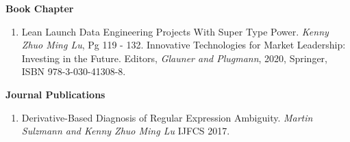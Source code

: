 \documentclass[margin,line]{res}
\begin{document}
\begin{resume}
{{\bf Book Chapter}
\begin{enumerate}
\item Lean Launch Data Engineering Projects With Super
    Type Power. \textit{Kenny Zhuo Ming Lu}, Pg 119 - 132. Innovative
    Technologies for Market Leadership: Investing in the
    Future. Editors, \textit{Glauner and Plugmann}, 2020, Springer,
    ISBN 978-3-030-41308-8.
\end{enumerate}



{\bf Journal Publications}
\begin{enumerate}
\item Derivative-Based Diagnosis of Regular Expression
  Ambiguity. \textit{Martin Sulzmann and Kenny Zhuo Ming Lu} IJFCS 2017.
\end{enumerate}


}
\end{resume}
\end{document}
